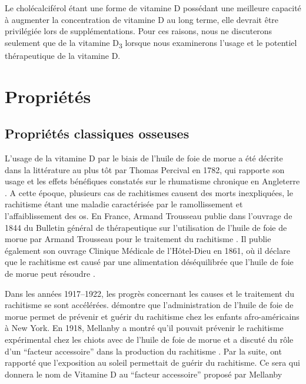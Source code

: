 \documentclass[
  a4paper,
  DIV=11,
  numbers=noendperiod,
  listof=totoc]{scrreprt}
\begin{document}
Le cholécalciférol étant une forme de vitamine D possédant une meilleure
capacité à augmenter la concentration de vitamine D au long terme, elle
devrait être privilégiée lors de supplémentations. Pour ces raisons,
nous ne discuterons seulement que de la vitamine D\textsubscript{3}
lorsque nous examinerons l'usage et le potentiel thérapeutique de la
vitamine D.

\hypertarget{propriuxe9tuxe9s}{%
\section{Propriétés}\label{propriuxe9tuxe9s}}

\hypertarget{propriuxe9tuxe9s-classiques-osseuses}{%
\subsection{Propriétés classiques
osseuses}\label{propriuxe9tuxe9s-classiques-osseuses}}

L'usage de la vitamine D par le biais de l'huile de foie de morue a été
décrite dans la littérature au plus tôt par Thomas Percival en 1782, qui
rapporte son usage et les effets bénéfiques constatés sur le rhumatisme
chronique en Angleterre \autocite{Percival.1782}. A cette époque,
plusieurs cas de rachitismes causent des morts inexpliquées, le
rachitisme étant une maladie caractérisée par le ramollissement et
l'affaiblissement des os. En France, Armand Trousseau publie dans
l'ouvrage de 1844 du Bulletin général de thérapeutique sur l'utilisation
de l'huile de foie de morue par Armand Trousseau pour le traitement du
rachitisme \autocite{bulletin.1844}. Il publie également son ouvrage
Clinique Médicale de l'Hôtel-Dieu en 1861, où il déclare que le
rachitisme est causé par une alimentation déséquilibrée que l'huile de
foie de morue peut résoudre \autocite{Hernigou.2019}.

Dans les années 1917--1922, les progrès concernant les causes et le
traitement du rachitisme se sont accélérées. \textcite{Hess.1917}
démontre que l'administration de l'huile de foie de morue permet de
prévenir et guérir du rachitisme chez les enfants afro-américains à New
York. En 1918, Mellanby a montré qu'il pouvait prévenir le rachitisme
expérimental chez les chiots avec de l'huile de foie de morue et a
discuté du rôle d'un ``facteur accessoire'' dans la production du
rachitisme \autocite[Riordan.2014]{O}. Par la suite,
\textcite{Hess.1921} ont rapporté que l'exposition au soleil permettait
de guérir du rachitisme. Ce sera \textcite{McCollum.1922} qui donnera le
nom de Vitamine D au ``facteur accessoire'' proposé par Mellanby
\autocite{Hernigou.2019,Mavrotas.2021}
\end{document}
